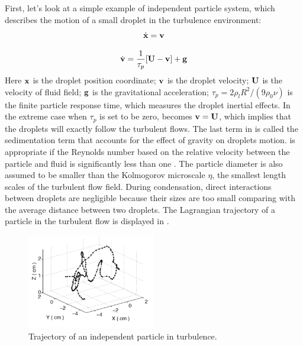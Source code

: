 First, let's look at a simple example of independent particle system, which describes the motion of a small droplet in the turbulence environment:
\begin{equation}
\dot{\mathbf{x}}=\mathbf{v}\label{droplet_x_eqn}
\end{equation}

\begin{equation}
\dot{\mathbf{v}}=\frac{1}{\tau_{p}}[\mathbf{U}-\mathbf{v}]+\mathbf{g}\label{droplet_v_eqn}
\end{equation}
Here $\mathbf{x}$ is the droplet position coordinate; 
$\mathbf{v}$ is the droplet velocity; $\mathbf{U}$ is the velocity of fluid field;
$\mathbf{g}$ is the gravitational acceleration; $\tau_{p}=2\rho_{l}R^{2}/(9\rho_{0}\nu)$ is the finite particle response time, which measures the droplet inertial
effects. In the extreme case when $\tau_{p}$ is set to be zero, 
becomes $\mathbf{v}=\mathbf{U}$, which implies that the
droplets will exactly follow the turbulent flows. The last term in  is called the sedimentation term that accounts for the effect of
gravity on droplets motion.  is appropriate if the
Reynolds number based on the relative velocity between the particle and fluid
is significantly less than one \cite{Eaton1994}. The particle diameter is also
assumed to be smaller than the Kolmogorov microscale $\eta$, the smallest
length scales of the turbulent flow field. During condensation, direct
interactions between droplets are negligible because their sizes are too small
comparing with the average distance between two droplets. The Lagrangian trajectory of a particle in the turbulent flow is displayed in .
\begin{figure}
\centering
\includegraphics[width=0.5\textwidth]{Figures/Lagrangian_trajectory}
\caption{Trajectory of an independent particle in turbulence.}
\label{fig:lag_traj}
\end{figure}

